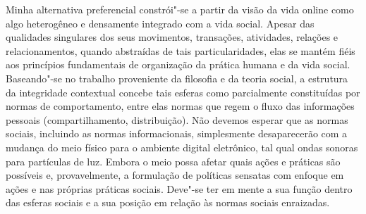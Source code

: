 Minha alternativa preferencial constrói"-se a partir da visão da vida
online como algo heterogêneo e densamente integrado com a vida social.
Apesar das qualidades singulares dos seus movimentos, transações,
atividades, relações e relacionamentos, quando abstraídas de tais
particularidades, elas se mantém fiéis aos princípios fundamentais de
organização da prática humana e da vida social. Baseando"-se no trabalho
proveniente da filosofia e da teoria social, a estrutura da integridade
contextual concebe tais esferas como parcialmente constituídas por
normas de comportamento, entre elas normas que regem o fluxo das
informações pessoais (compartilhamento, distribuição). Não devemos
esperar que as normas sociais, incluindo as normas informacionais,
simplesmente desaparecerão com a mudança do meio físico para o ambiente
digital eletrônico, tal qual ondas sonoras para partículas de luz.
Embora o meio possa afetar quais ações e práticas são possíveis e,
provavelmente, a formulação de políticas sensatas com enfoque em ações e
nas próprias práticas sociais. Deve"-se ter em mente a sua função dentro
das esferas sociais e a sua posição em relação às normas sociais
enraizadas.

